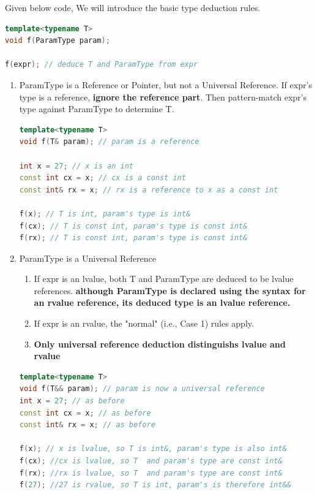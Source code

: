 \documentclass[a4paper,11pt,twoside]{book}
\begin{document}
Given below code, We will introduce the basic type deduction rules.
\begin{lstlisting}[frame=single, language=c++]
template<typename T>
void f(ParamType param);

f(expr); // deduce T and ParamType from expr
\end{lstlisting}

\begin{enumerate}
	
	\item ParamType is a Reference or Pointer, but not a Universal Reference. If expr's type is a reference, \textbf{ignore the reference part}. Then pattern-match expr's type against ParamType to determine T.
\begin{lstlisting}[frame=single, language=c++]
template<typename T>
void f(T& param); // param is a reference
	
int x = 27; // x is an int
const int cx = x; // cx is a const int
const int& rx = x; // rx is a reference to x as a const int
	
f(x); // T is int, param's type is int&
f(cx); // T is const int, param's type is const int&
f(rx); // T is const int, param's type is const int&
\end{lstlisting}
	
	\item ParamType is a Universal Reference
	
	\begin{enumerate}
		\item If expr is an lvalue, both T and ParamType are deduced to be lvalue references.
		\textbf{although ParamType is declared using the syntax for an rvalue reference, its deduced type is an lvalue reference.}
		
		\item If expr is an rvalue, the "normal" (i.e., Case 1) rules apply.
		
		\item \textbf{Only universal reference deduction distinguishs lvalue and rvalue}
	\end{enumerate}
	
\begin{lstlisting}[frame=single, language=c++]
template<typename T>
void f(T&& param); // param is now a universal reference
int x = 27; // as before
const int cx = x; // as before
const int& rx = x; // as before
	
f(x); // x is lvalue, so T is int&, param's type is also int&
f(cx); //cx is lvalue, so T  and param's type are const int&
f(rx); //rx is lvalue, so T  and param's type are const int&
f(27); //27 is rvalue, so T is int, param's is therefore int&&
\end{lstlisting}
	

\end{enumerate}
\end{document}
